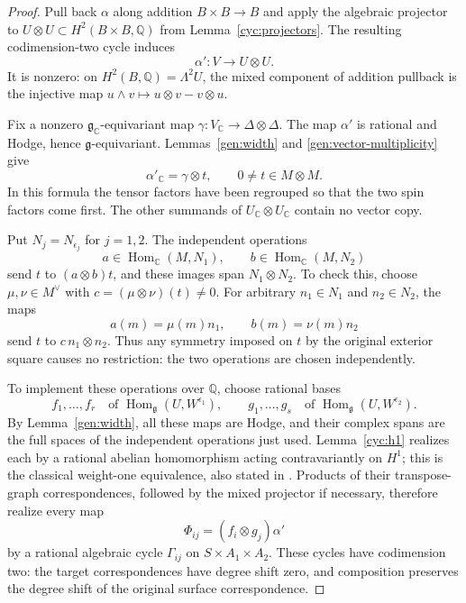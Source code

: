 \begin{proof}
Pull back $\alpha$ along addition $B\times B\to B$ and apply the
algebraic projector to $U\otimes U\subset H^2(B\times B,\mathbb Q)$
from Lemma~\ref{cyc:projectors}.  The resulting codimension-two cycle
induces
\[
 \alpha':V\longrightarrow U\otimes U.
\]
It is nonzero: on $H^2(B,\mathbb Q)=\Lambda^2U$, the mixed component
of addition pullback is the injective map
$u\wedge v\mapsto u\otimes v-v\otimes u$.

Fix a nonzero $\mathfrak g_{\mathbb C}$-equivariant map
$\gamma:V_{\mathbb C}\to\Delta\otimes\Delta$.
The map $\alpha'$ is rational and Hodge, hence
$\mathfrak g$-equivariant.  Lemmas~\ref{gen:width} and
\ref{gen:vector-multiplicity} give
\begin{equation}\label{gen:initial-tensor}
 \alpha'_{\mathbb C}=\gamma\otimes t,
 \qquad 0\ne t\in M\otimes M.
\end{equation}
In this formula the tensor factors have been regrouped so that the
two spin factors come first.  The other summands of
$U_{\mathbb C}\otimes U_{\mathbb C}$ contain no vector copy.

Put $N_j=N_{\epsilon_j}$ for $j=1,2$.  The independent operations
\[
 a\in\operatorname{Hom}_{\mathbb C}(M,N_1),\qquad
 b\in\operatorname{Hom}_{\mathbb C}(M,N_2)
\]
send $t$ to $(a\otimes b)t$, and these images span
$N_1\otimes N_2$.  To check this, choose
$\mu,\nu\in M^\vee$ with $c=(\mu\otimes\nu)(t)\ne0$.
For arbitrary $n_1\in N_1$ and $n_2\in N_2$, the maps
\[
 a(m)=\mu(m)n_1,\qquad b(m)=\nu(m)n_2
\]
send $t$ to $c\,n_1\otimes n_2$.  Thus any symmetry imposed on $t$
by the original exterior square causes no restriction: the two
operations are chosen independently.

To implement these operations over $\mathbb Q$, choose rational bases
\[
 f_1,\ldots,f_r\quad\text{of }
 \operatorname{Hom}_{\mathfrak g}(U,W^{\epsilon_1}),\qquad
 g_1,\ldots,g_s\quad\text{of }
 \operatorname{Hom}_{\mathfrak g}(U,W^{\epsilon_2}).
\]
By Lemma~\ref{gen:width}, all these maps are Hodge, and their complex
spans are the full spaces of the independent operations just used.
Lemma~\ref{cyc:h1} realizes each by a rational abelian homomorphism
acting contravariantly on $H^1$; this is the classical weight-one
equivalence, also stated in \cite[Theorem~6.8 and Corollary~6.9]{Milne}.
Products of their transpose-graph correspondences, followed by the mixed
projector if necessary, therefore realize every map
\begin{equation}\label{gen:rational-generators}
 \Phi_{ij}=(f_i\otimes g_j)\alpha'
\end{equation}
by a rational algebraic cycle $\Gamma_{ij}$ on
$S\times A_1\times A_2$.
These cycles have codimension two: the target correspondences have
degree shift zero, and composition preserves the degree shift of
the original surface correspondence.


\end{proof}
